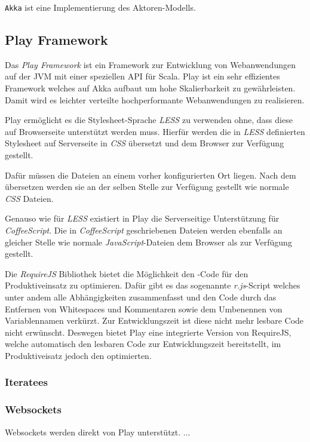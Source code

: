 \cite{actors}

\texttt{Akka} ist eine Implementierung des Aktoren-Modells.

\subsection{Play Framework}

Das \textit{Play Framework} ist ein Framework zur Entwicklung von Webanwendungen  auf der JVM mit
einer speziellen API für Scala. Play ist ein sehr effizientes  Framework welches auf Akka aufbaut um
hohe Skalierbarkeit zu gewährleisten.  Damit wird es leichter verteilte hochperformante
Webanwendungen zu realisieren.

Play ermöglicht es die Stylesheet-Sprache \textit{LESS} zu verwenden ohne,  dass diese auf
Browserseite unterstützt werden muss. Hierfür werden die in  \textit{LESS} definierten Stylesheet
auf Serverseite in \textit{CSS} übersetzt  und dem Browser zur Verfügung gestellt.

Dafür müssen die Dateien an einem vorher konfigurierten Ort liegen. Nach dem  übersetzen werden sie
an der selben Stelle zur Verfügung gestellt wie normale  \textit{CSS} Dateien.

Genauso wie für \textit{LESS} existiert in Play die Serverseitige Unterstützung  für
\textit{CoffeeScript}. Die in \textit{CoffeeScript} geschriebenen Dateien  werden ebenfalls an
gleicher Stelle wie normale \textit{JavaScript}-Dateien dem  Browser als  zur
Verfügung gestellt.

Die \textit{RequireJS} Bibliothek bietet die Möglichkeit den  -Code für den
Produktiveinsatz zu optimieren. Dafür gibt es  das sogenannte \textit{r.js}-Script welches unter
andem alle Abhängigkeiten  zusammenfasst und den Code durch das Entfernen von Whitespaces und
Kommentaren  sowie dem Umbenennen von Variablennamen verkürzt. Zur Entwicklungszeit ist diese  nicht
mehr lesbare Code nicht erwünscht. Deswegen bietet Play eine integrierte  Version von RequireJS,
welche automatisch den lesbaren Code zur Entwicklungszeit  bereitstellt, im Produktiveisatz jedoch
den optimierten.

\subsubsection{Iteratees}

\subsubsection{Websockets}

Websockets werden direkt von Play unterstützt. ...